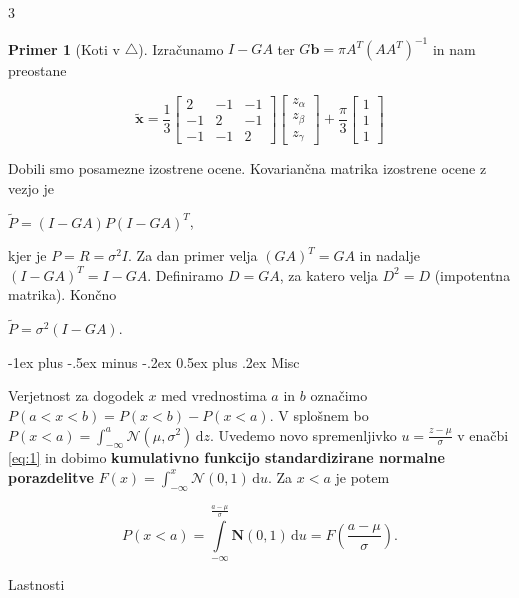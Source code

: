 \documentclass[10pt,landscape]{article}
\makeatletter
\renewcommand{\section}{\@startsection{section}{1}{0mm}%
	{-1ex plus -.5ex minus -.2ex}%
	{0.5ex plus .2ex}%
	{\normalfont\large\bfseries}}
\theoremstyle{definition}
\newtheorem*{primer}{Primer}
\makeatother
\begin{document}
\begin{multicols}{3}
\begin{primer}[Koti v \(\triangle\)]
  Izračunamo \( I - GA \) ter \( G \mathbf{b} = \pi A^T \left( A A^T \right)^{-1} \) in nam preostane

  \[ \tilde{\mathbf{x}} = \frac{1}{3} \begin{bmatrix}
                                      2 & -1 & -1 \\
                                      -1 & 2 & -1 \\
                                      -1 & -1 & 2
                                      \end{bmatrix} \begin{bmatrix} z_{\alpha} \\ z_{\beta} \\ z_{\gamma} \end{bmatrix} + \frac{\pi}{3} \begin{bmatrix} 1 \\ 1 \\ 1 \end{bmatrix}
  \]

  Dobili smo posamezne izostrene ocene. Kovariančna matrika izostrene ocene z vezjo je

  \( \tilde{P} = \left( I - GA \right) P \left( I - GA \right)^T \),

  kjer je \( P = R = \sigma ^2 I \). Za dan primer velja \( (GA)^T = GA \) in nadalje \( \left( I - GA \right)^T = I - GA \). Definiramo \( D = GA \), za katero velja \( D ^2 = D \) (impotentna matrika). Končno

  \( \tilde{P} = \sigma ^2 \left( I - GA \right) \).
\end{primer}
\section{Misc}

Verjetnost za dogodek \( x \) med vrednostima \( a \) in \( b \) označimo \( P (a < x < b) = P(x < b) - P(x < a) \). V splošnem bo \( P (x < a) = \int_{- \infty}^{a} \mathcal{N} (\mu, \sigma ^2) \, \mathrm{d} z \).  Uvedemo novo spremenljivko \( u = \frac{z - \mu}{\sigma} \) v enačbi \ref{eq:1} in dobimo \textbf{kumulativno funkcijo standardizirane normalne porazdelitve} \( F(x) = \int_{- \infty}^x \mathcal{N}(0, 1) \, \mathrm{d} u \). Za \( x < a \) je potem

\[ P(x < a) = \int\limits_{- \infty}^{\frac{a - \mu}{\sigma}} \mathbf{N}(0, 1) \, \mathrm{d} u = F \left( \frac{a - \mu}{\sigma} \right).
\]

Lastnosti


\end{multicols}
\end{document}
